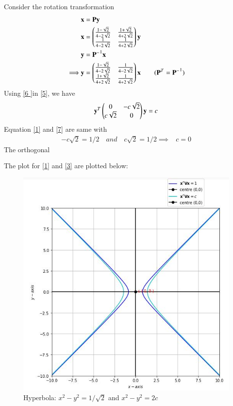 \documentclass[journal,12pt,twocolumn]{IEEEtran}
\begin{document}
Consider the rotation transformation
\begin{align}
	& \mathbf{x} = \mathbf{P}\mathbf{y} \\
	& \mathbf{x} = \begin{pmatrix}\frac{1-\sqrt{2}}{4-2\sqrt{2}} & \frac{1+\sqrt{2}}{4+2\sqrt{2}} \\ \frac{1}{4-2\sqrt{2}} & \frac{1}{4+2\sqrt{2}}\end{pmatrix}\mathbf{y} \\
	& \mathbf{y} = \mathbf{P^-}^1\mathbf{x} \\
\implies & \mathbf{y} =\begin{pmatrix}\frac{1-\sqrt{2}}{4-2\sqrt{2}} & \frac{1}{4-2\sqrt{2}} \\ \frac{1+\sqrt{2}}{4+2\sqrt{2}}  & \frac{1}{4+2\sqrt{2}}\end{pmatrix} \mathbf{x} \qquad (\mathbf{P}^T = \mathbf{P^-}^1) \label{6 }
\end{align}
Using \eqref{6 }in \eqref{5}, we have
\begin{align}
	\mathbf{y}^T\begin{pmatrix}0 & -c\sqrt{2} \\ c\sqrt{2} & 0\end{pmatrix}\mathbf{y} = c \label{7}
\end{align}
Equation \eqref{1} and \eqref{7} are same with 
\begin{align}
- c\sqrt{2} = 1/2 \quad and \quad  c\sqrt{2} = 1/2 \implies & c= 0
\end{align}
The orthogonal

The plot for \eqref{1} and \eqref{3} are plotted below:

\begin{figure}[!htb]

	
	\includegraphics[width=\columnwidth]{Assignment5.jpg}
	
	\caption{Hyperbola: $x^2-y^2=1/\sqrt{2}$ and $x^2 - y^2=2c$}
	
	\label{fig:1}
	
\end{figure}
\end{document}
